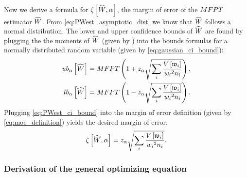 Now we derive a formula for $\zeta \left[ \widehat{W}, \alpha \right]$, the margin of error of the $MFPT$ estimator $\widehat{W}$. From \eqref{eq:PWest_asymptotic_dist} we know that $\widehat{W}$ follows a normal distribution. The lower and upper confidence bounds of $\widehat{W}$ are found by plugging the the moments of $\widehat{W}$ (given by ) into the bounds formulas for a normally distributed random variable (given by \eqref{eq:gaussian_ci_bound}):
    \begin{align}
    \label{eq:PWest_ci_bound}
        \begin{split}
            ub_{\alpha} \left[ \widehat{W} \right] &= MFPT \left(1 + z_{\alpha} \sqrt{\sum_i \frac{V \left[ \mathfrak{w}_{i} \right]}{w_{i} {}^2 n_{i}}} \right), \\
            lb_{\alpha} \left[ \widehat{W} \right] &= MFPT \left(1 - z_{\alpha} \sqrt{\sum_i \frac{V \left[ \mathfrak{w}_{i} \right]}{w_{i} {}^2 n_{i}}} \right).
        \end{split}
    \end{align}
Plugging \eqref{eq:PWest_ci_bound} into the margin of error definition (given by \eqref{eq:moe_definition}) yields the desired margin of error:
    \begin{equation}
    \label{eq:product_estimator_zeta}
        \zeta \left[ \widehat{W}, \alpha \right] = z_{\alpha} \sqrt{\sum_i \frac{V \left[ \mathfrak{w}_{i} \right]}{w_{i} {}^2 n_i}}.
    \end{equation}

\subsubsection{Derivation of the general optimizing equation}

